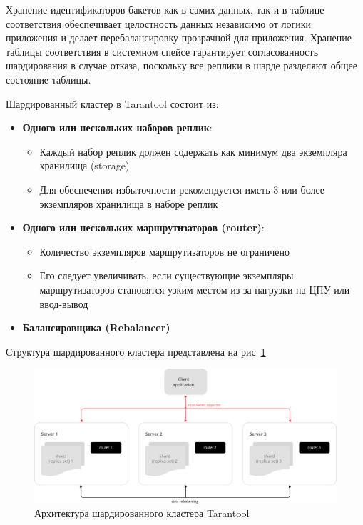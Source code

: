 Хранение идентификаторов бакетов как в самих данных, так и в таблице
соответствия обеспечивает целостность данных независимо от логики приложения и
делает перебалансировку прозрачной для приложения. Хранение таблицы
соответствия в системном спейсе гарантирует согласованность шардирования в
случае отказа, поскольку все реплики в шарде разделяют общее состояние таблицы.

Шардированный кластер в Tarantool состоит из:

\begin{itemize}
    \item \textbf{Одного или нескольких наборов реплик}:
    \begin{itemize}
        \item Каждый набор реплик должен содержать как минимум два экземпляра
              хранилища (storage)
        \item Для обеспечения избыточности рекомендуется иметь 3 или более
              экземпляров хранилища в наборе реплик
    \end{itemize}

    \item \textbf{Одного или нескольких маршрутизаторов (router)}:
    \begin{itemize}
        \item Количество экземпляров маршрутизаторов не ограничено
        \item Его следует увеличивать, если существующие экземпляры
              маршрутизаторов становятся узким местом из-за нагрузки на ЦПУ или
              ввод-вывод
    \end{itemize}
    \item \textbf{Балансировщика (Rebalancer)}
\end{itemize}

Структура шардированного кластера представлена на рис~\ref{fig:fig05}

\begin{figure}
  \centering
  \includegraphics[scale=0.35]{inc/schema.svg}
  \caption{Архитектура шардированного кластера Tarantool}
  \label{fig:fig05}
\end{figure}

